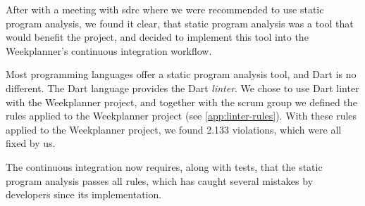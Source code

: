 After with a meeting with \gls{sdrc} where we were recommended to use static program analysis, we found it clear, that static program analysis was a tool that would benefit the project, and decided to implement this tool into the Weekplanner's continuous integration workflow.

Most programming languages offer a static program analysis tool, and Dart is no different. The Dart language provides the Dart \textit{linter}\cite{dart_linter_2019}. We chose to use Dart linter with the Weekplanner project, and together with the scrum group we defined the rules applied to the Weekplanner project (see \autoref{app:linter-rules}). With these rules applied to the Weekplanner project, we found 2.133 violations, which were all fixed by us. 

The continuous integration now requires, along with tests, that the static program analysis passes all rules, which has caught several mistakes by developers since its implementation.